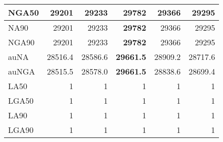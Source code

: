 \documentclass[12pt,a4paper]{article}
\begin{document}
\begin{table}[ht]
\begin{center}
\begin{tabular}{|l*{5}{|r}|}
NGA50 & 29201 & 29233 & {\bf 29782} & 29366 & 29295 \\ \hline
NA90 & 29201 & 29233 & {\bf 29782} & 29366 & 29295 \\ \hline
NGA90 & 29201 & 29233 & {\bf 29782} & 29366 & 29295 \\ \hline
auNA & 28516.4 & 28586.6 & {\bf 29661.5} & 28909.2 & 28717.6 \\ \hline
auNGA & 28515.5 & 28578.0 & {\bf 29661.5} & 28838.6 & 28699.4 \\ \hline
LA50 & 1 & 1 & 1 & 1 & 1 \\ \hline
LGA50 & 1 & 1 & 1 & 1 & 1 \\ \hline
LA90 & 1 & 1 & 1 & 1 & 1 \\ \hline
LGA90 & 1 & 1 & 1 & 1 & 1 \\ \hline
\end{tabular}
\end{center}
\end{table}
\end{document}
